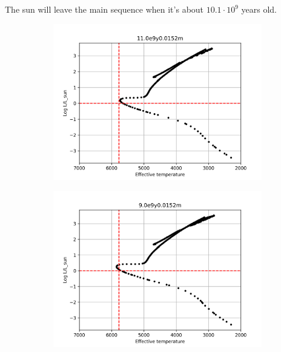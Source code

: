 \documentclass[11pt,a4paper]{article}
\begin{document}
    The sun will leave the main sequence when it's about $10.1 \cdot 10^9$ years old.

    \begin{figure}[h]
        \centering
        \begin{subfigure}{.5\textwidth}
            \centering
            \includegraphics[width=\linewidth]{figures/11.0e9y0.0152m}
            \label{fig:sub1}
        \end{subfigure}%
        \begin{subfigure}{.5\textwidth}
            \centering
            \includegraphics[width=\linewidth]{figures/9.0e9y0.0152m}
            \label{fig:sub2}
        \end{subfigure}

\end{figure}
\end{document}
